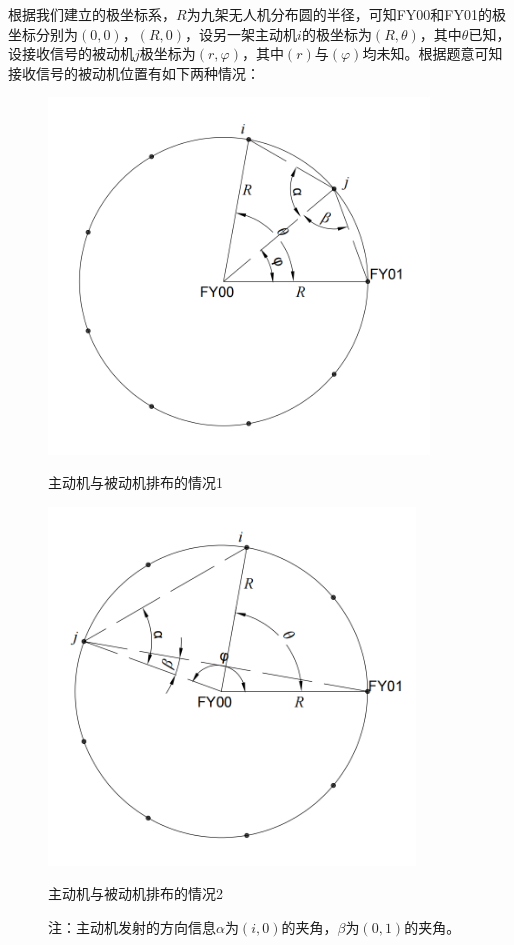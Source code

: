 \documentclass[withoutpreface,bwprint]{cumcmthesis} %
\begin{document}
根据我们建立的极坐标系，$R$为九架无人机分布圆的半径，可知FY00和FY01的极坐标分别为$(0,0)$，$(R,0)$，设另一架主动机$i$的极坐标为$(R,\theta)$，其中$\theta$已知，设接收信号的被动机$j$极坐标为$(r,\varphi)$，其中$(r)$与$(\varphi)$均未知。根据题意可知接收信号的被动机位置有如下两种情况：
\begin{figure}[H]
    \centering
    \begin{minipage}{0.49\textwidth}
        \centering
        \includegraphics[width=0.9\textwidth]{../../figure/q1_1.png} 
        \caption{主动机与被动机排布的情况1}
        \label{q1_1}
    \end{minipage}
    \begin{minipage}{0.49\textwidth}
        \centering
        \includegraphics[width=0.868\textwidth]{../../figure/q1_2.png} 
        \caption{主动机与被动机排布的情况2}
        \label{q1_2}   
    \end{minipage}
    \caption*{\small 注：主动机发射的方向信息$\alpha$为$(i,0)$的夹角，$\beta$为$(0,1)$的夹角。}
\end{figure}
\end{document}
